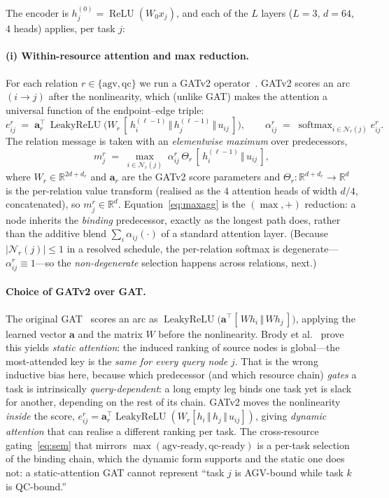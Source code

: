 \documentclass[11pt]{article}
\newcommand{\R}{\mathbb{R}}
\DeclareMathOperator{\softmax}{softmax}
\DeclareMathOperator{\LeakyReLU}{LeakyReLU}
\DeclareMathOperator{\ReLU}{ReLU}
\DeclareMathOperator*{\maxop}{max}
\newcommand{\concat}{\,\Vert\,}
\begin{document}
The encoder is $h_j^{(0)}=\ReLU(W_0 x_j)$, and each of the $L$ layers ($L{=}3$, $d{=}64$,
$4$ heads) applies, per task $j$:

\paragraph{(i) Within-resource attention and max reduction.}
For each relation $r\in\{\mathrm{agv},\mathrm{qc}\}$ we run a GATv2
operator~\cite{brody2022gatv2}. GATv2 scores an arc $(i\!\to\! j)$ after the
nonlinearity, which (unlike GAT) makes the attention a universal function of the
endpoint--edge triple:
\begin{equation}
e^{r}_{ij} \;=\; \mathbf a_r^{\!\top}\,
\LeakyReLU\!\big(W_r\,[\,h_i^{(\ell-1)}\concat h_j^{(\ell-1)}\concat u_{ij}\,]\big),
\qquad
\alpha^{r}_{ij} \;=\; \softmax_{i\in\mathcal N_r(j)} e^{r}_{ij}.
\end{equation}
The relation message is taken with an \emph{elementwise maximum} over predecessors,
\begin{equation}
m^{r}_j \;=\; \maxop_{i\in\mathcal N_r(j)}\; \alpha^{r}_{ij}\,\Theta_r\,
[\,h_i^{(\ell-1)}\concat u_{ij}\,],
\label{eq:maxagg}
\end{equation}
where $W_r\in\R^{2d+d_e}$ and $\mathbf a_r$ are the GATv2 score parameters and
$\Theta_r\colon\R^{d+d_e}\!\to\!\R^{d}$ is the per-relation value transform (realised as the
$4$ attention heads of width $d/4$, concatenated), so $m^{r}_j\in\R^{d}$.
Equation~\eqref{eq:maxagg} is the $(\max,+)$ reduction: a node inherits the \emph{binding}
predecessor, exactly as the longest path does, rather than the additive blend
$\sum_i\alpha_{ij}(\cdot)$ of a standard attention layer. (Because $|\mathcal N_r(j)|\le1$ in a resolved schedule, the
per-relation softmax is degenerate---$\alpha^{r}_{ij}\equiv1$---so the \emph{non-degenerate}
selection happens across relations, next.)

\paragraph{Choice of GATv2 over GAT.} The original
GAT~\cite{velickovic2018gat} scores an arc as
$\LeakyReLU\!\big(\mathbf a^{\!\top}[\,W h_i\concat W h_j\,]\big)$, applying the learned
vector $\mathbf a$ and the matrix $W$ before the nonlinearity. Brody et
al.~\cite{brody2022gatv2} prove this yields \emph{static attention}: the induced ranking of
source nodes is global---the most-attended key is the \emph{same for every query node} $j$.
That is the wrong inductive bias here, because which predecessor (and which resource chain)
\emph{gates} a task is intrinsically \emph{query-dependent}: a long empty leg binds one task
yet is slack for another, depending on the rest of its chain. GATv2 moves the nonlinearity
\emph{inside} the score, $e^{r}_{ij}=\mathbf a_r^{\!\top}\LeakyReLU(W_r[h_i\concat h_j\concat
u_{ij}])$, giving \emph{dynamic attention} that can realise a different ranking per task.
The cross-resource gating~\eqref{eq:sem} that mirrors
$\max(\text{agv-ready},\text{qc-ready})$ is a per-task selection of the binding
chain, which the dynamic form supports and the static one does not: a static-attention GAT
cannot represent ``task $j$ is AGV-bound while task $k$ is QC-bound.''
\end{document}
